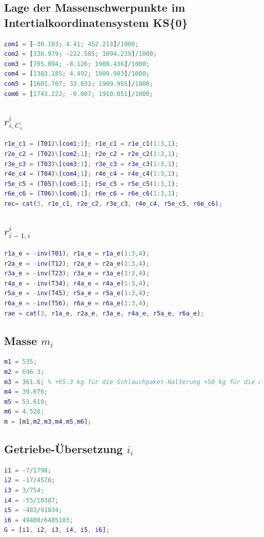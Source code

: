 \subsection{Lage der Massenschwerpunkte im Intertialkoordinatensystem KS\{0\}}
%
\begin{lstlisting}[language=Matlab, numbers=none]
com1 = [-30.103; 4.41; 452.213]/1000;
com2 = [330.979; -222.585; 1094.239]/1000;
com3 = [705.894; -8.126; 1908.436]/1000;
com4 = [1383.185; 4.492; 1909.983]/1000;
com5 = [1601.767; 33.833; 1909.955]/1000;
com6 = [1743.222; -0.007; 1910.051]/1000;
\end{lstlisting}
%
\subsection{$r^{i}_{i,C_i}$}
%
\begin{lstlisting}[language=Matlab, numbers=none]
r1e_c1 = (T01)\[com1;1]; r1e_c1 = r1e_c1(1:3,1);
r2e_c2 = (T02)\[com2;1]; r2e_c2 = r2e_c2(1:3,1);
r3e_c3 = (T03)\[com3;1]; r3e_c3 = r3e_c3(1:3,1);
r4e_c4 = (T04)\[com4;1]; r4e_c4 = r4e_c4(1:3,1);
r5e_c5 = (T05)\[com5;1]; r5e_c5 = r5e_c5(1:3,1);
r6e_c6 = (T06)\[com6;1]; r6e_c6 = r6e_c6(1:3,1);
rec= cat(3, r1e_c1, r2e_c2, r3e_c3, r4e_c4, r5e_c5, r6e_c6);
\end{lstlisting}
%
\subsection{$r^{i}_{i-1,i}$}
%
\begin{lstlisting}[language=Matlab, numbers=none]
r1a_e = -inv(T01); r1a_e = r1a_e(1:3,4);
r2a_e = -inv(T12); r2a_e = r2a_e(1:3,4);
r3a_e = -inv(T23); r3a_e = r3a_e(1:3,4);
r4a_e = -inv(T34); r4a_e = r4a_e(1:3,4);
r5a_e = -inv(T45); r5a_e = r5a_e(1:3,4);
r6a_e = -inv(T56); r6a_e = r6a_e(1:3,4);
rae = cat(3, r1a_e, r2a_e, r3a_e, r4a_e, r5a_e, r6a_e);
\end{lstlisting}
%
\subsection{Masse $m_i$}
%
\begin{lstlisting}[language=Matlab, numbers=none]
m1 = 535;
m2 = 696.3;
m3 = 361.6; % +65.3 kg für die Schlauchpaket-Halterung +50 kg für die Antriebe 4 und 5;
m4 = 39.676;
m5 = 53.619;
m6 = 4.528;
m = [m1,m2,m3,m4,m5,m6];
\end{lstlisting}
%
\subsection{Getriebe-Übersetzung $i_i$}
%
\begin{lstlisting}[language=Matlab, numbers=none]
i1 = -7/1798;
i2 = -17/4576;
i3 = 3/754;
i4 = -55/10387;
i5 = -483/91834;
i6 = 49400/6485103;
G = [i1, i2, i3, i4, i5, i6];
\end{lstlisting}
%
\setcounter{section}{2}
